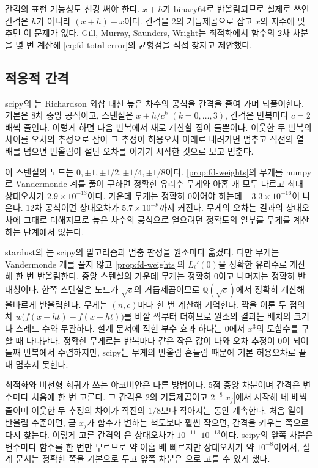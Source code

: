 간격의 표현 가능성도 신경 써야 한다. $x+h$가 binary64로 반올림되므로 실제로 쓰인 간격은 $h$가 아니라 $(x+h)-x$이다. 간격을 2의 거듭제곱으로 잡고 $x$의 지수에 맞추면 이 문제가 없다. Gill, Murray, Saunders, Wright는 최적화에서 함수의 2차 차분을 몇 번 계산해 \eqref{eq:fd-total-error}의 균형점을 직접 찾자고 제안했다\cite{gill1983}.

\subsection{적응적 간격}

scipy의 는 Richardson 외삽 대신 높은 차수의 공식을 간격을 줄여 가며 되풀이한다. 기본은 $8$차 중앙 공식이고, 스텐실은 $x\pm h/c^k$ $(k=0,\dots,3)$, 간격은 반복마다 $c=2$배씩 줄인다. 이렇게 하면 다음 반복에서 새로 계산할 점이 둘뿐이다. 이웃한 두 반복의 차이를 오차의 추정으로 삼아 그 추정이 허용오차 아래로 내려가면 멈추고 직전의 열 배를 넘으면 반올림이 절단 오차를 이기기 시작한 것으로 보고 멈춘다.

이 스텐실의 노드는 $0,\pm1,\pm1/2,\pm1/4,\pm1/8$이다. \cref{prop:fd-weights}의 무게를 numpy로 Vandermonde 계를 풀어 구하면 정확한 유리수 무게와 아홉 개 모두 다르고 최대 상대오차가 $2.9\times10^{-13}$이다. 가운데 무게는 정확히 $0$이어야 하는데 $-3.3\times10^{-16}$이 나온다. $12$차 공식이면 상대오차가 $5.7\times10^{-8}$까지 커진다. 무게의 오차는 결과의 상대오차에 그대로 더해지므로 높은 차수의 공식으로 얻으려던 정확도의 일부를 무게를 계산하는 단계에서 잃는다.

\begin{instardust}
stardust의 는 scipy의 알고리즘과 멈춤 판정을 원소마다 옮겼다. 다만 무게는 Vandermonde 계를 풀지 않고 \cref{prop:fd-weights}의 $L_i'(0)$을 정확한 유리수로 계산해 한 번 반올림한다. 중앙 스텐실의 가운데 무게는 정확히 $0$이고 나머지는 정확히 반대칭이다. 한쪽 스텐실은 노드가 $\sqrt c$의 거듭제곱이므로 $\mathbb Q(\sqrt c)$에서 정확히 계산해 올바르게 반올림한다. 무게는 $(n,c)$마다 한 번 계산해 기억한다. 짝을 이룬 두 점의 차 $w\bigl(f(x-ht)-f(x+ht)\bigr)$를 바깥 짝부터 더하므로 원소의 결과는 배치의 크기나 스레드 수와 무관하다. 설계 문서에 적힌 부수 효과 하나는 $0$에서 $x^3$의 도함수를 구할 때 나타난다. 정확한 무게로는 반복마다 같은 작은 값이 나와 오차 추정이 $0$이 되어 둘째 반복에서 수렴하지만, scipy는 무게의 반올림 흔들림 때문에 기본 허용오차로 끝내 멈추지 못한다.
\end{instardust}

\begin{instardust}
최적화와 비선형 회귀가 쓰는 야코비안은 다른 방법이다. 5점 중앙 차분이며 간격은 변수마다 처음에 한 번 고른다. 그 간격은 2의 거듭제곱이고 $2^{-8}|x_j|$에서 시작해 네 배씩 줄이며 이웃한 두 추정의 차이가 직전의 $1/8$보다 작아지는 동안 계속한다. 처음 열이 반올림 수준이면, 곧 $x_j$가 함수가 변하는 척도보다 훨씬 작으면, 간격을 키우는 쪽으로 다시 찾는다. 이렇게 고른 간격의 은 상대오차가 $10^{-11}$--$10^{-13}$이다. scipy의 앞쪽 차분은 변수마다 함수를 한 번만 부르므로 약 아홉 배 빠르지만 상대오차가 약 $10^{-8}$이어서, 설계 문서는 정확한 쪽을 기본으로 두고 앞쪽 차분은 으로 고를 수 있게 했다.
\end{instardust}

